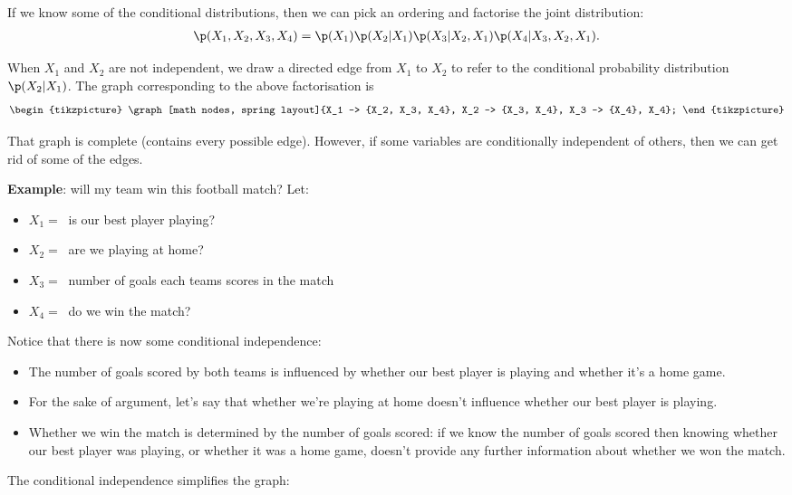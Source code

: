If we know some of the conditional distributions, then we can pick an ordering and factorise the joint
distribution:
\begin{align*}
  \p(X_1, X_2, X_3, X_4) = \p(X_1) \p(X_2|X_1) \p(X_3|X_2, X_1) \p(X_4|X_3, X_2, X_1).
\end{align*}

When $X_1$ and $X_2$ are not independent, we draw a directed edge from $X_1$ to $X_2$ to refer to the conditional probability distribution $\p(X_2|X_1)$. The graph corresponding to the above factorisation is
\begin{align*}
\begin{tikzpicture}
  \graph[math nodes, spring layout]{X_1 -> {X_2, X_3, X_4}, X_2 -> {X_3, X_4}, X_3 -> {X_4}, X_4};
\end{tikzpicture}
\end{align*}

That graph is complete (contains every possible edge). However, if some variables are conditionally independent of others, then we can get rid of some of the edges.

{\bf Example}: will my team win this football match?
Let:
\begin{itemize}[label=$\circ$]
\item $X_1 = ~$ is our best player playing?
\item $X_2 = ~$ are we playing at home?
\item $X_3 = ~$ number of goals each teams scores in the match
\item $X_4 = ~$ do we win the match?
\end{itemize}

Notice that there is now some conditional independence:
\begin{itemize}
\item The number of goals scored by both teams is influenced by whether our best player is playing and whether it's a home game.
\item For the sake of argument, let's say that whether we're playing at home doesn't influence whether our best player is playing.
\item Whether we win the match is determined by the number of goals scored: if we know the number of goals scored then knowing whether our best player was playing, or whether it was a home game, doesn't provide any further information about whether we won the match.
\end{itemize}
The conditional independence simplifies the graph:

